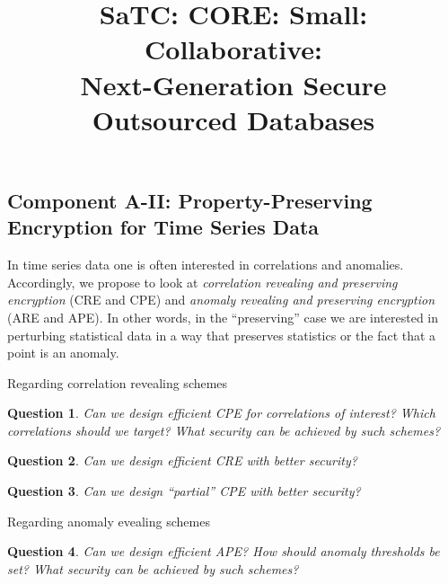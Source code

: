 \documentclass[11pt]{article}
\title{{{\Large{SaTC: CORE: Small:  Collaborative: \\Next-Generation Secure Outsourced Databases}}}}
\date{}
\newtheorem{question}{Question}[section]
\theoremstyle{remark}
\begin{document}
\maketitle
\vspace{-22mm}





\iffalse
\subsection{Component A-II:  Property-Preserving Encryption for Time Series Data} 

In time series data one is often interested in correlations and anomalies.  Accordingly, we propose to look at \emph{correlation revealing and preserving encryption}  (CRE and CPE) and \emph{anomaly revealing and preserving encryption} (ARE and APE).  In other words, in the ``preserving'' case we are interested in perturbing statistical data in a way that preserves statistics or the fact that a point is an anomaly.  

Regarding correlation revealing schemes
\begin{question}
Can we design efficient CPE for correlations of interest?  Which correlations should we target?  What security can be achieved by such schemes?
\end{question}


\begin{question}
Can we design efficient CRE with better security?
\end{question}

\begin{question}
Can we design ``partial'' CPE with better security?
\end{question}


Regarding anomaly  evealing schemes
\begin{question}
Can we design efficient APE?  How should anomaly thresholds be set?  What security can be achieved by such schemes?
\end{question}
\end{document}
